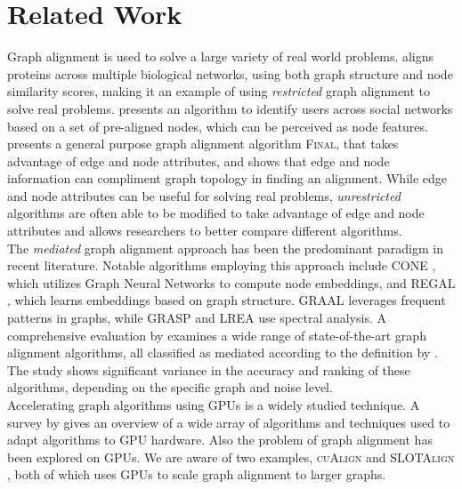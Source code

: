 \section{Related Work}\label{related_work}
Graph alignment is used to solve a large variety of real world problems. \cite{singh2008isorank} aligns proteins across multiple biological networks, using both graph structure and node similarity scores, making it an example of using \textit{restricted} graph alignment to solve real problems. \cite{kazemi2015growing} presents an algorithm to identify users across social networks based on a set of pre-aligned nodes, which can be perceived as node features. \cite{zhang2016final} presents a general purpose graph alignment algorithm \textsc{Final}, that takes advantage of edge and node attributes, and shows that edge and node information can compliment graph topology in finding an alignment. While edge and node attributes can be useful for solving real problems, \textit{unrestricted} algorithms are often able to be modified to take advantage of edge and node attributes and allows researchers to better compare different algorithms.\\

The \textit{mediated} graph alignment approach has been the predominant paradigm in recent literature. Notable algorithms employing this approach include \textsc{CONE} \citep{chen2020cone}, which utilizes Graph Neural Networks to compute node embeddings, and \textsc{REGAL} \citep{heimann2018regal}, which learns embeddings based on graph structure. \textsc{GRAAL} \cite{kuchaiev2010topological} leverages frequent patterns in graphs, while \textsc{GRASP} \citep{hermanns2021grasp} and \textsc{LREA} \citep{nassar2018low} use spectral analysis. A comprehensive evaluation by \cite{skitsas2023GAEval} examines a wide range of state-of-the-art graph alignment algorithms, all classified as mediated according to the definition by \cite{fugal2024}. The study shows significant variance in the accuracy and ranking of these algorithms, depending on the specific graph and noise level.\\

Accelerating graph algorithms using GPUs is a widely studied technique. A survey by \cite{shi2018graph} gives an overview of a wide array of algorithms and techniques used to adapt algorithms to GPU hardware. Also the problem of graph alignment has been explored on GPUs. We are aware of two examples, \textsc{cuAlign} \citep{xiang2023cualign} and \textsc{SLOTAlign} \citep{tang2023robust}, both of which uses GPUs to scale graph alignment to larger graphs.